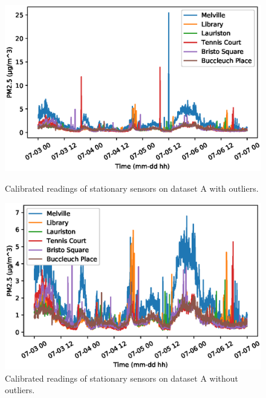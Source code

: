 \begin{figure}[H] 
\centering
\vspace{1cm}
\includegraphics[width=\linewidth]{images/calibrated_data.eps} 
\caption{Calibrated readings of stationary sensors on dataset A with outliers.}
\label{fig:raw_with_outliers}
\vspace{1cm}

\includegraphics[width=\linewidth]{images/calibrated_data_no_outliers.eps} 
\caption{Calibrated readings of stationary sensors on dataset A without outliers.}
\label{fig:raw_without_outliers}
\vspace{1cm}

\end{figure}


